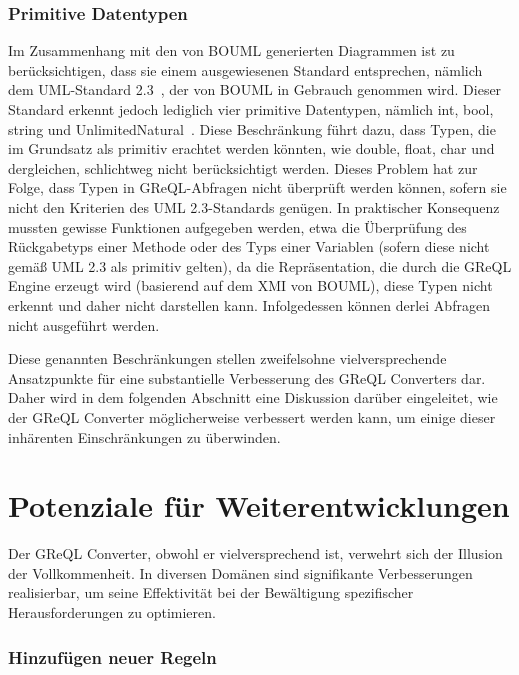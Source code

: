\subsubsection{Primitive Datentypen}

Im Zusammenhang mit den von BOUML generierten Diagrammen ist zu berücksichtigen, dass sie einem ausgewiesenen Standard
entsprechen, nämlich dem UML-Standard 2.3~\cite{OMG_UML_23_Infrastructure}, der von BOUML in Gebrauch genommen wird.
Dieser Standard erkennt jedoch lediglich vier primitive Datentypen, nämlich int, bool, string und
UnlimitedNatural~\cite{OMG_UML_23_Infrastructure}. Diese Beschränkung führt dazu, dass Typen, die im Grundsatz als
primitiv erachtet werden könnten, wie double, float, char und dergleichen, schlichtweg nicht berücksichtigt werden.
Dieses Problem hat zur Folge, dass Typen in GReQL-Abfragen nicht überprüft werden können, sofern sie nicht den Kriterien
des UML 2.3-Standards genügen. In praktischer Konsequenz mussten gewisse Funktionen aufgegeben werden, etwa die
Überprüfung des Rückgabetyps einer Methode oder des Typs einer Variablen (sofern diese nicht gemäß UML 2.3 als primitiv
gelten), da die Repräsentation, die durch die GReQL Engine erzeugt wird (basierend auf dem XMI von BOUML), diese Typen
nicht erkennt und daher nicht darstellen kann. Infolgedessen können derlei Abfragen nicht ausgeführt werden.


Diese genannten Beschränkungen stellen zweifelsohne vielversprechende Ansatzpunkte für eine substantielle Verbesserung
des GReQL Converters dar. Daher wird in dem folgenden Abschnitt eine Diskussion darüber eingeleitet, wie der GReQL
Converter möglicherweise verbessert werden kann, um einige dieser inhärenten Einschränkungen zu überwinden.


\section{Potenziale für Weiterentwicklungen}

Der GReQL Converter, obwohl er vielversprechend ist, verwehrt sich der Illusion der Vollkommenheit. In diversen Domänen
sind signifikante Verbesserungen realisierbar, um seine Effektivität bei der Bewältigung spezifischer Herausforderungen
zu optimieren.

\subsubsection{Hinzufügen neuer Regeln}

